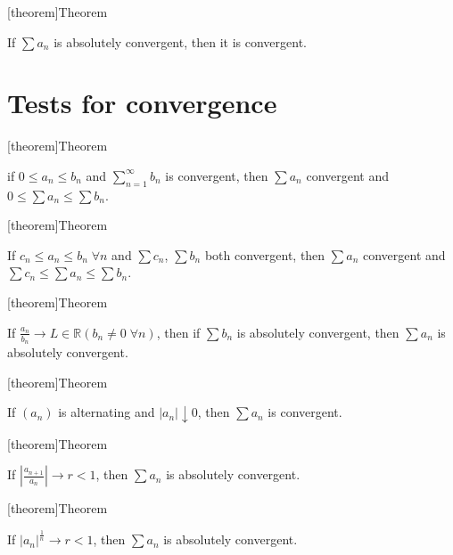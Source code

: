 \documentclass[12pt]{report}
\theoremstyle{definition}
\begin{document}
[theorem]{Theorem}
\begin{absolute convergence is convergence}
    If $\sum a_n$ is absolutely convergent, then it is convergent.
\end{absolute convergence is convergence}

\section{Tests for convergence}
[theorem]{Theorem}
\begin{comparison test 1}
    if $0 \le a_n \le b_n$ and $\sum_{n=1}^{\infty} b_n$ is convergent, then
    $\sum a_n$ convergent and $0 \le \sum a_n \le \sum b_n$.
\end{comparison test 1}

[theorem]{Theorem}
\begin{comparison test 2}
    If $c_n \le a_n \le b_n \;\forall n$ and $\sum c_n$, $\sum b_n$ both convergent, 
    then $\sum a_n$ convergent and $\sum c_n \le \sum a_n \le \sum b_n$.
\end{comparison test 2}

[theorem]{Theorem}
\begin{comparison test 3}
    If $\frac{a_n}{b_n} \rightarrow L \in \mathbb{R} (b_n \neq 0 \;\forall n)$,
    then if $\sum b_n$ is absolutely convergent, then $\sum a_n$ is absolutely convergent.
\end{comparison test 3}

[theorem]{Theorem}
\begin{alternating series test}
    If $(a_n)$ is alternating and $|a_n| \downarrow 0$, then $\sum a_n$ is convergent.
\end{alternating series test}

[theorem]{Theorem}
\begin{ratio test}
    If $\left|\frac{a_{n+1}}{a_n}\right| \rightarrow r < 1$, then $\sum a_n$ is absolutely convergent.
\end{ratio test}

[theorem]{Theorem}
\begin{root test}
    If ${|a_n|}^{\frac{1}{n}} \rightarrow r < 1$, then $\sum a_n$ is absolutely convergent.
\end{root test}
\end{document}
